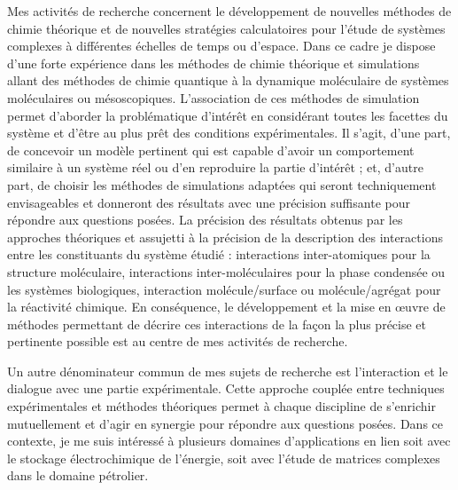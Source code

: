 \documentclass[11pt]{artuppax}
\begin{document}
Mes activités de recherche concernent le développement de nouvelles méthodes de chimie théorique et de nouvelles stratégies calculatoires pour l'étude de systèmes complexes à différentes échelles de temps ou d'espace. Dans ce cadre je dispose d'une forte expérience dans les méthodes de chimie théorique et simulations allant des méthodes de chimie quantique à la dynamique moléculaire de systèmes moléculaires ou mésoscopiques. L'association de ces méthodes de simulation permet d'aborder la problématique d'intérêt en considérant toutes les facettes du système et d'être au plus prêt des conditions expérimentales. Il s'agit, d'une part, de concevoir un modèle pertinent qui est capable d'avoir un comportement similaire à un système réel ou d'en reproduire la partie d'intérêt ; et, d'autre part, de choisir les méthodes de simulations adaptées qui seront techniquement envisageables et donneront des résultats avec une précision suffisante pour répondre aux questions posées. La précision des résultats obtenus par les approches théoriques et assujetti à la précision de la description des interactions entre les constituants du système étudié : interactions inter-atomiques pour la structure moléculaire, interactions inter-moléculaires pour la phase condensée ou les systèmes biologiques, interaction molécule/surface ou molécule/agrégat pour la réactivité chimique. En conséquence, le développement et la mise en œuvre de méthodes permettant de décrire ces interactions de la façon la plus précise et pertinente possible est au centre de mes activités de recherche.

Un autre dénominateur commun de mes sujets de recherche est l'interaction et le dialogue avec une partie expérimentale. Cette approche couplée entre techniques expérimentales et méthodes théoriques permet à chaque discipline de s'enrichir mutuellement et d'agir en synergie pour répondre aux questions posées. Dans ce contexte, je me suis intéressé à plusieurs domaines d'applications en lien soit avec le stockage électrochimique de l'énergie, soit avec l'étude de matrices complexes dans le domaine pétrolier.
\end{document}
